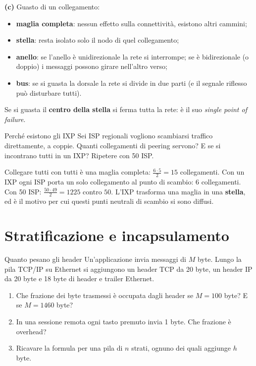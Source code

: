 \textbf{(c)} Guasto di un collegamento:
\begin{itemize}
    \item \textbf{maglia completa}: nessun effetto sulla connettività, esistono altri cammini;
    \item \textbf{stella}: resta isolato solo il nodo di quel collegamento;
    \item \textbf{anello}: se l'anello è unidirezionale la rete si interrompe; se è bidirezionale (o doppio) i messaggi
          possono girare nell'altro verso;
    \item \textbf{bus}: se si guasta la dorsale la rete si divide in due parti (e il segnale riflesso può disturbare tutti).
\end{itemize}
Se si guasta il \textbf{centro della stella} si ferma tutta la rete: è il suo \emph{single point of failure}.

\begin{esercizio}{Perché esistono gli IXP}
Sei ISP regionali vogliono scambiarsi traffico direttamente, a coppie. Quanti collegamenti di peering servono? E se si
incontrano tutti in un IXP? Ripetere con 50 ISP.
\end{esercizio}

\svolgimento
Collegare tutti con tutti è una maglia completa: $\frac{6 \cdot 5}{2} = 15$ collegamenti. Con un IXP ogni ISP porta un solo
collegamento al punto di scambio: $6$ collegamenti. Con 50 ISP: $\frac{50 \cdot 49}{2} = 1225$ contro $50$. L'IXP trasforma una
maglia in una \textbf{stella}, ed è il motivo per cui questi punti neutrali di scambio si sono diffusi.

\section{Stratificazione e incapsulamento}

\begin{esercizio}{Quanto pesano gli header}
Un'applicazione invia messaggi di $M$ byte. Lungo la pila TCP/IP su Ethernet si aggiungono un header TCP da 20 byte, un header
IP da 20 byte e 18 byte di header e trailer Ethernet.
\begin{enumerate}[label=(\alph*)]
    \item Che frazione dei byte trasmessi è occupata dagli header se $M = 100$ byte? E se $M = 1460$ byte?
    \item In una sessione remota ogni tasto premuto invia 1 byte. Che frazione è overhead?
    \item Ricavare la formula per una pila di $n$ strati, ognuno dei quali aggiunge $h$ byte.
\end{enumerate}
\end{esercizio}

